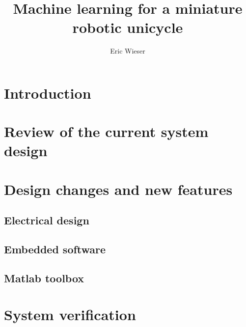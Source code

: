 \documentclass[12pt,a4paper]{IIBproject}
\begin{document}


	\author{Eric Wieser}
	\title{Machine learning for a miniature robotic unicycle}
	\maketitle



	\begin{abstract}
	\end{abstract}
	\pagestyle{plain}
	\tableofcontents
	\newpage

	\listoftodos

	\newpage

	\chapter{Introduction}
	

	\chapter{Review of the current system design}
	

	\chapter{Design changes and new features}

		\section{Electrical design}
		

		\section{Embedded software}
		

		\section{Matlab toolbox}
		

	\chapter{System verification}
	
\end{document}
